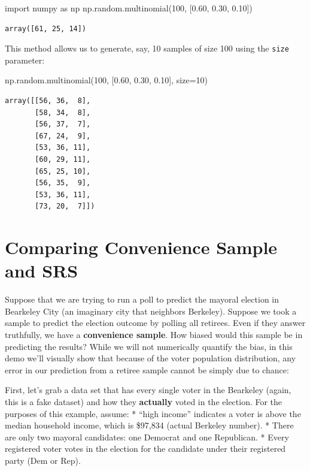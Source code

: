 \documentclass[
  letterpaper,
  DIV=11,
  numbers=noendperiod]{scrreprt}
\newenvironment{Shaded}{\begin{snugshade}}{\end{snugshade}}
\newcommand{\DecValTok}[1]{\textcolor[rgb]{0.68,0.00,0.00}{#1}}
\newcommand{\FloatTok}[1]{\textcolor[rgb]{0.68,0.00,0.00}{#1}}
\newcommand{\ImportTok}[1]{\textcolor[rgb]{0.00,0.46,0.62}{#1}}
\newcommand{\NormalTok}[1]{\textcolor[rgb]{0.00,0.23,0.31}{#1}}
\newcommand{\OperatorTok}[1]{\textcolor[rgb]{0.37,0.37,0.37}{#1}}
\begin{document}
\begin{Shaded}
\begin{Highlighting}[]
\ImportTok{import}\NormalTok{ numpy }\ImportTok{as}\NormalTok{ np}
\NormalTok{np.random.multinomial(}\DecValTok{100}\NormalTok{, [}\FloatTok{0.60}\NormalTok{, }\FloatTok{0.30}\NormalTok{, }\FloatTok{0.10}\NormalTok{])}
\end{Highlighting}
\end{Shaded}

\begin{verbatim}
array([61, 25, 14])
\end{verbatim}

This method allows us to generate, say, 10 samples of size 100 using the
\texttt{size} parameter:

\begin{Shaded}
\begin{Highlighting}[]
\NormalTok{np.random.multinomial(}\DecValTok{100}\NormalTok{, [}\FloatTok{0.60}\NormalTok{, }\FloatTok{0.30}\NormalTok{, }\FloatTok{0.10}\NormalTok{], size}\OperatorTok{=}\DecValTok{10}\NormalTok{)}
\end{Highlighting}
\end{Shaded}

\begin{verbatim}
array([[56, 36,  8],
       [58, 34,  8],
       [56, 37,  7],
       [67, 24,  9],
       [53, 36, 11],
       [60, 29, 11],
       [65, 25, 10],
       [56, 35,  9],
       [53, 36, 11],
       [73, 20,  7]])
\end{verbatim}

\hypertarget{comparing-convenience-sample-and-srs}{%
\section{Comparing Convenience Sample and
SRS}\label{comparing-convenience-sample-and-srs}}

Suppose that we are trying to run a poll to predict the mayoral election
in Bearkeley City (an imaginary city that neighbors Berkeley). Suppose
we took a sample to predict the election outcome by polling all
retirees. Even if they answer truthfully, we have a \textbf{convenience
sample}. How biased would this sample be in predicting the results?
While we will not numerically quantify the bias, in this demo we'll
visually show that because of the voter population distribution, any
error in our prediction from a retiree sample cannot be simply due to
chance:

First, let's grab a data set that has every single voter in the
Bearkeley (again, this is a fake dataset) and how they \textbf{actually}
voted in the election. For the purposes of this example, assume: *
``high income'' indicates a voter is above the median household income,
which is \$97,834 (actual Berkeley number). * There are only two mayoral
candidates: one Democrat and one Republican. * Every registered voter
votes in the election for the candidate under their registered party
(Dem or Rep).
\end{document}
